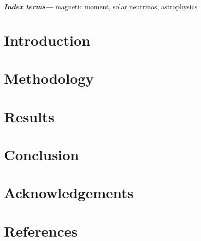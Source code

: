 \documentclass[12pt]{iopart}
\providecommand{\keywords}[1]{\textbf{\textit{Index terms---}} #1}
\begin{document}
\keywords{magnetic moment, solar neutrinos, astrophysics}
\submitto{\jpg}
\maketitle



\section{Introduction}
\label{sec:introduction}


\section{Methodology}
\label{sec:methodoglogy}


\section{Results}
\label{sec:results}


\section{Conclusion}
\label{sec:conclusion}




\section{Acknowledgements}
\label{sec:acknowledgements}


\section{References}
\label{sec:references}
\end{document}
